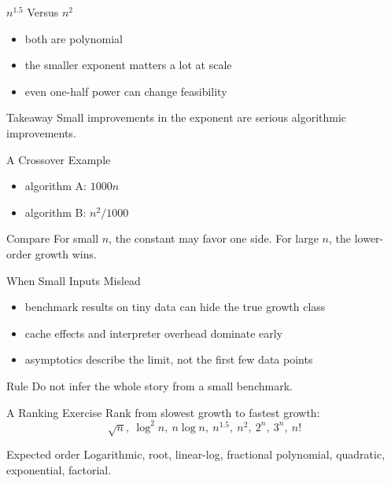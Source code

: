 \documentclass[aspectratio=169,xcolor=dvipsnames]{beamer}
\begin{document}
\begin{frame}{$n^{1.5}$ Versus $n^2$}
  \begin{itemize}
    \item both are polynomial
    \item the smaller exponent matters a lot at scale
    \item even one-half power can change feasibility
  \end{itemize}
  \begin{exampleblock}{Takeaway}
    Small improvements in the exponent are serious algorithmic improvements.
  \end{exampleblock}
\end{frame}

\begin{frame}{A Crossover Example}
  \begin{itemize}
    \item algorithm A: $1000n$
    \item algorithm B: $n^2/1000$
  \end{itemize}
  \begin{block}{Compare}
    For small $n$, the constant may favor one side. For large $n$, the lower-order growth wins.
  \end{block}
\end{frame}

\begin{frame}{When Small Inputs Mislead}
  \begin{itemize}
    \item benchmark results on tiny data can hide the true growth class
    \item cache effects and interpreter overhead dominate early
    \item asymptotics describe the limit, not the first few data points
  \end{itemize}
  \begin{alertblock}{Rule}
    Do not infer the whole story from a small benchmark.
  \end{alertblock}
\end{frame}

\begin{frame}{A Ranking Exercise}
  Rank from slowest growth to fastest growth:
  \[
    \sqrt{n},\ \log^2 n,\ n\log n,\ n^{1.5},\ n^2,\ 2^n,\ 3^n,\ n!
  \]
  \begin{block}{Expected order}
    Logarithmic, root, linear-log, fractional polynomial, quadratic, exponential, factorial.
  \end{block}
\end{frame}
\end{document}
